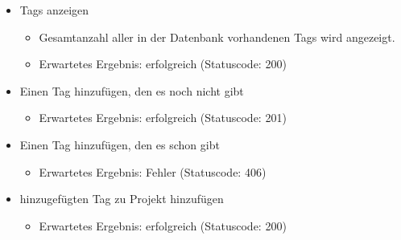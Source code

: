\documentclass[12pt]{scrartcl}
\begin{document}
\begin{itemize}
				\item Tags anzeigen
				\begin{itemize}
					\item Gesamtanzahl aller in der Datenbank vorhandenen Tags wird angezeigt.
					\item Erwartetes Ergebnis: erfolgreich (Statuscode: 200)
				\end{itemize}
				\item Einen Tag hinzufügen, den es noch nicht gibt
				\begin{itemize}
					\item Erwartetes Ergebnis: erfolgreich (Statuscode: 201)
				\end{itemize}
				\item Einen Tag hinzufügen, den es schon gibt
				\begin{itemize}
					\item Erwartetes Ergebnis: Fehler (Statuscode: 406)
				\end{itemize}
				\item hinzugefügten Tag zu Projekt hinzufügen
				\begin{itemize}
					\item Erwartetes Ergebnis: erfolgreich (Statuscode: 200)
				\end{itemize}
				

\end{itemize}
\end{document}
